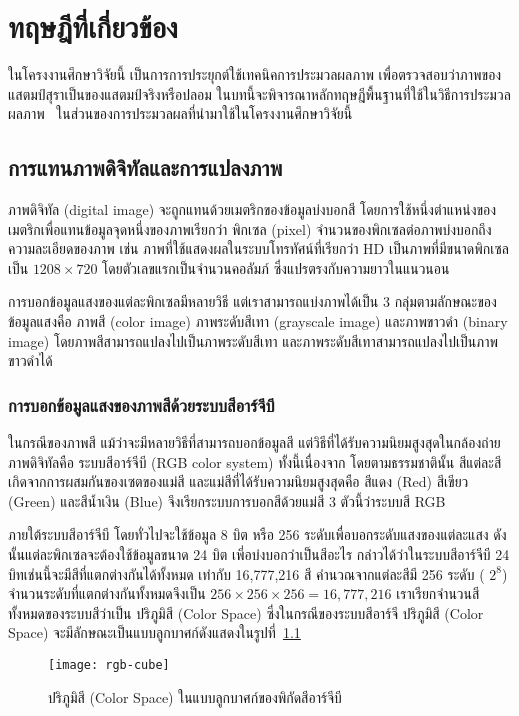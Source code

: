 \chapter{ทฤษฎีที่เกี่ยวข้อง}
\label{ch:theory}
ในโครงงานศึกษาวิจัยนี้ เป็นการการประยุกต์ใช้เทคนิคการประมวลผลภาพ เพื่อตรวจสอบว่าภาพของแสตมป์สุราเป็นของแสตมป์จริงหรือปลอม ในบทนี้จะพิจารณาหลักทฤษฎีพื้นฐานที่ใช้ในวิธีการประมวลผลภาพ~\cite{Kosin48} ในส่วนของการประมวลผลที่นำมาใช้ในโครงงานศึกษาวิจัยนี้

\section{การแทนภาพดิจิทัลและการแปลงภาพ}
ภาพดิจิทัล (digital image) จะถูกแทนด้วยเมตริกของข้อมูลบ่งบอกสี โดยการใช้หนึ่งตำแหน่งของเมตริกเพื่อแทนข้อมูลจุดหนึ่งของภาพเรียกว่า พิกเซล (pixel)  จำนวนของพิกเซลต่อภาพบ่งบอกถึงความละเอียดของภาพ เช่น ภาพที่ใช้แสดงผลในระบบโทรทัศน์ที่เรียกว่า HD เป็นภาพที่มีขนาดพิกเซลเป็น $1208\times 720$ โดยตัวเลขแรกเป็นจำนวนคอลัมภ์ ซึ่งแปรตรงกับความยาวในแนวนอน

การบอกข้อมูลแสงของแต่ละพิกเซลมีหลายวิธี แต่เราสามารถแบ่งภาพได้เป็น 3 กลุ่มตามลักษณะของข้อมูลแสงคือ ภาพสี (color image) ภาพระดับสีเทา (grayscale image) และภาพขาวดำ (binary image) โดยภาพสีสามารถแปลงไปเป็นภาพระดับสีเทา และภาพระดับสีเทาสามารถแปลงไปเป็นภาพขาวดำได้ 

\subsection{การบอกข้อมูลแสงของภาพสีด้วยระบบสีอาร์จีบี}
ในกรณีของภาพสี แม้ว่าจะมีหลายวิธีที่สามารถบอกข้อมูลสี แต่วิธีที่ได้รับความนิยมสูงสุดในกล้องถ่ายภาพดิจิทัลคือ ระบบสีอาร์จีบี (RGB color system) ทั้งนี้เนื่องจาก โดยตามธรรมชาตินั้น สีแต่ละสีเกิดจากการผสมกันของเซตของแม่สี และแม่สีที่ได้รับความนิยมสูงสุดคือ สีแดง (Red) สีเขียว (Green) และสีน้ำเงิน (Blue) จึงเรียกระบบการบอกสีด้วยแม่สี 3 ตัวนี้ว่าระบบสี RGB  

ภายใต้ระบบสีอาร์จีบี โดยทั่วไปจะใช้ข้อมูล 8 บิต หรือ 256 ระดับเพื่อบอกระดับแสงของแต่ละแสง  ดังนั้นแต่ละพิกเซลจะต้องใช้ข้อมูลขนาด 24 บิต เพี่อบ่งบอกว่าเป็นสีอะไร  กล่าวได้ว่าในระบบสีอาร์จีบี 24 บิทเช่นนี้จะมีสีที่แตกต่างกันได้ทั้งหมด เท่ากับ 16,777,216 สี คำนวณจากแต่ละสีมี 256 ระดับ ( $2^{8}$) จำนวนระดับที่แตกต่างกันทั้งหมดจึงเป็น $256\times 256\times 256 = 16,777,216$  เราเรียกจำนวนสีทั้งหมดของระบบสีว่าเป็น ปริภูมิสี (Color Space) ซึ่งในกรณีของระบบสีอาร์จี  ปริภูมิสี (Color Space) จะมีลักษณะเป็นแบบลูกบาศก์ดังแสดงในรูปที่~\ref{fig:2-1} 

\vspace{1em}
\begin{figure}[!ht]
\centering
\texttt{[image: rgb-cube]}
\caption{ปริภูมิสี (Color Space) ในแบบลูกบาศก์ของพิกัดสีอาร์จีบี~\cite{RGBspace}}
\label{fig:2-1}
\end{figure}

